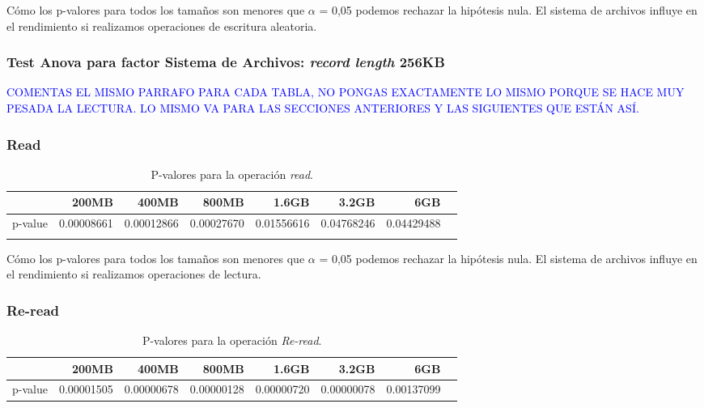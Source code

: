 Cómo los p-valores para todos los tamaños son menores que $\alpha$ = 0,05 podemos rechazar la hipótesis nula. El sistema de archivos influye en el rendimiento si realizamos operaciones de escritura aleatoria. 














\subsubsection{Test Anova para factor Sistema de Archivos: \textit{record length} 256KB}

\textcolor{blue}{COMENTAS EL MISMO PARRAFO PARA CADA TABLA, NO PONGAS EXACTAMENTE LO MISMO PORQUE SE HACE MUY PESADA LA LECTURA. LO MISMO VA PARA LAS SECCIONES ANTERIORES Y LAS SIGUIENTES QUE ESTÁN ASÍ.}

\subsubsection{Read}
\begin{table}[!htp]\centering
\scriptsize
\begin{tabular}{lrrrrrrr}\toprule
&200MB &400MB &800MB &1.6GB &3.2GB &6GB \\\midrule
p-value &0.00008661 &0.00012866 &0.00027670 &0.01556616 &0.04768246 &0.04429488 \\ \\
\bottomrule
\end{tabular}
\caption{P-valores para la operación \textit{read}.}\label{tab: }
\end{table}

Cómo los p-valores para todos los tamaños son menores que $\alpha$ = 0,05 podemos rechazar la hipótesis nula. El sistema de archivos influye en el rendimiento si realizamos operaciones de lectura. 

\subsubsection{Re-read}
\begin{table}[!htp]\centering
\scriptsize
\begin{tabular}{lrrrrrrr}\toprule
&200MB &400MB &800MB &1.6GB &3.2GB &6GB \\\midrule
p-value &0.00001505 &0.00000678 &0.00000128 &0.00000720 &0.00000078 &0.00137099 \\
\bottomrule
\end{tabular}
\caption{P-valores para la operación \textit{Re-read}.}\label{tab: }
\end{table}

